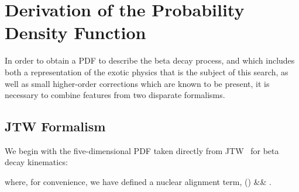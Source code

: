 %
%
%
\chapter[Derivation of the Probability Density Function]{Derivation of the Probability Density Function}
\label{appendix_forthepeople}
In order to obtain a \acf{PDF} to describe the beta decay process, and which includes both a representation of the exotic physics that is the subject of this search, as well as small higher-order corrections which are known to be present, it is necessary to combine features from two disparate formalisms.  


\section[JTW Formalism]{JTW Formalism}
We begin with the five-dimensional \ac{PDF} taken directly from \acf{JTW}~\cite{jtw}\cite{jtw_coulomb} for beta decay kinematics:

where, for convenience, we have defined a nuclear alignment term,
\bea
\Talign(\vecJ) &\equiv& \TalignExpand.
\eea

